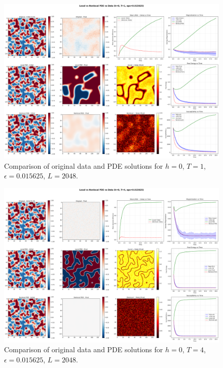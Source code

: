 \documentclass[11pt,a4paper]{article}
\begin{document}

\begin{figure}[!h]
    \centering
    \includegraphics[width=1.0\textwidth]{fig/compare_local_nonlocal_L2048_h0_T1_eps0.015625.png}
    \caption{Comparison of original data and PDE solutions for $h=0$, $T=1$, $\epsilon=0.015625$, $L=2048$.}
    \label{fig:pde_comparison_h0_T1_eps0.015625_L2048}
\end{figure}


\begin{figure}[!h]
    \centering
    \includegraphics[width=1.0\textwidth]{fig/compare_local_nonlocal_L2048_h0_T4_eps0.015625.png}
    \caption{Comparison of original data and PDE solutions for $h=0$, $T=4$, $\epsilon=0.015625$, $L=2048$.}
    \label{fig:pde_comparison_h0_T4_eps0.015625_L2048}
\end{figure}
\end{document}
